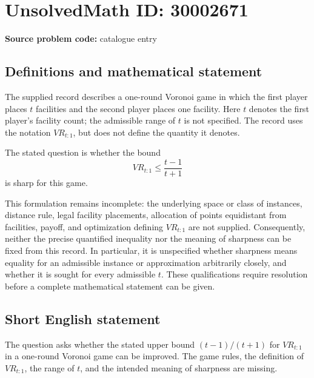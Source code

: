 \documentclass[11pt]{article}
\begin{document}
\section*{UnsolvedMath ID: 30002671}
\textbf{Source problem code:} catalogue entry
\subsection{Definitions and mathematical statement}
The supplied record describes a one-round Voronoi game in which the first player places \(t\) facilities and the second player places one facility. Here \(t\) denotes the first player's facility count; the admissible range of \(t\) is not specified. The record uses the notation \(VR_{t:1}\), but does not define the quantity it denotes.

The stated question is whether the bound
\[
VR_{t:1}\leq \frac{t-1}{t+1}
\]
is sharp for this game.

This formulation remains incomplete: the underlying space or class of instances, distance rule, legal facility placements, allocation of points equidistant from facilities, payoff, and optimization defining \(VR_{t:1}\) are not supplied. Consequently, neither the precise quantified inequality nor the meaning of sharpness can be fixed from this record. In particular, it is unspecified whether sharpness means equality for an admissible instance or approximation arbitrarily closely, and whether it is sought for every admissible \(t\). These qualifications require resolution before a complete mathematical statement can be given.
\subsection{Short English statement}
The question asks whether the stated upper bound \((t-1)/(t+1)\) for \(VR_{t:1}\) in a one-round Voronoi game can be improved. The game rules, the definition of \(VR_{t:1}\), the range of \(t\), and the intended meaning of sharpness are missing.
\end{document}
